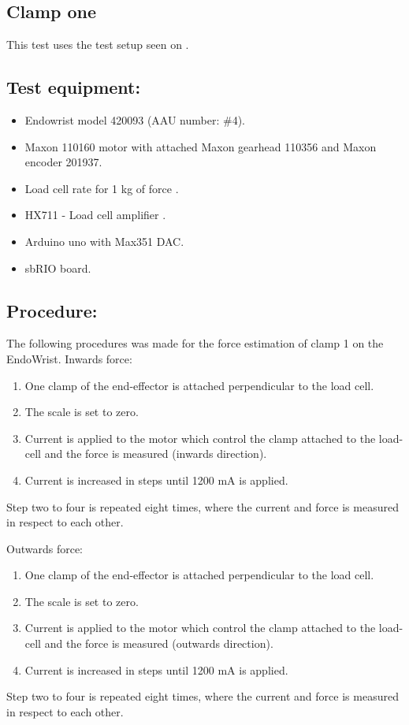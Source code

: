 \subsection{Clamp one} %
This test uses the test setup seen on .

\subsection*{Test equipment:}
\begin{itemize}
\item Endowrist model 420093 (AAU number: \#4).
\item Maxon 110160 motor with attached Maxon gearhead 110356 and Maxon encoder 201937.
\item Load cell rate for 1 kg of force \cite{Load_cell_1kg}.
\item HX711 - Load cell amplifier \cite{HX711}.
\item Arduino uno with Max351 DAC.
\item sbRIO board.
\end{itemize}

\subsection*{Procedure:}
The following procedures was made for the force estimation of clamp 1 on the EndoWrist. 
Inwards force:
\begin{enumerate}
\item One clamp of the end-effector is attached perpendicular to the load cell. 
\item The scale is set to zero.
\item Current is applied to the motor which control the clamp attached to the load-cell and the force is measured (inwards direction).
\item Current is increased in steps until 1200 mA is applied.
\end{enumerate}
Step two to four is repeated eight times, where the current and force is measured in respect to each other. 

Outwards force:
\begin{enumerate}
\item One clamp of the end-effector is attached perpendicular to the load cell. 
\item The scale is set to zero.
\item Current is applied to the motor which control the clamp attached to the load-cell and the force is measured (outwards direction).
\item Current is increased in steps until 1200 mA is applied.
\end{enumerate}
Step two to four is repeated eight times, where the current and force is measured in respect to each other. 

